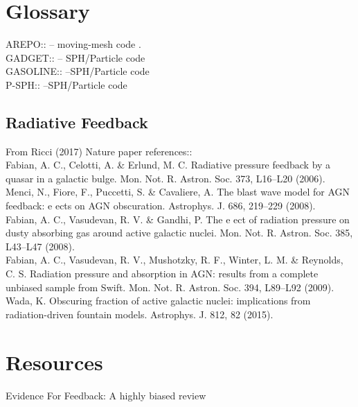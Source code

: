 \documentclass[11pt,a4paper]{article}
\begin{document}
\section{Glossary}
AREPO:: -- moving-mesh code \citep{Springel2010}.\\
GADGET:: -- SPH/Particle  code \\ 
GASOLINE:: --SPH/Particle  code \\
P-SPH:: --SPH/Particle  code \\
 
\subsection{Radiative Feedback}
From Ricci (2017) Nature paper references::\\
Fabian, A. C., Celotti, A. \& Erlund, M. C. Radiative pressure feedback by a quasar in a galactic bulge. Mon. Not. R. Astron. Soc. 373, L16–L20 (2006). \\
Menci, N., Fiore, F., Puccetti, S. \& Cavaliere, A. The blast wave model for AGN feedback: e ects on AGN obscuration. Astrophys. J. 686, 219–229 (2008). \\
Fabian, A. C., Vasudevan, R. V. \& Gandhi, P. The e ect of radiation pressure on dusty absorbing gas around active galactic nuclei. Mon. Not. R. Astron. Soc. 385, L43–L47 (2008).\\
Fabian, A. C., Vasudevan, R. V., Mushotzky, R. F., Winter, L. M. \& Reynolds, C. S. Radiation pressure and absorption in AGN: results from a complete unbiased sample from Swift. Mon. Not. R. Astron. Soc. 394, L89–L92 (2009). \\
Wada, K. Obscuring fraction of active galactic nuclei: implications from radiation-driven fountain models. Astrophys. J. 812, 82 (2015).

\section{Resources}
Evidence For Feedback: A highly biased review



\end{document}
